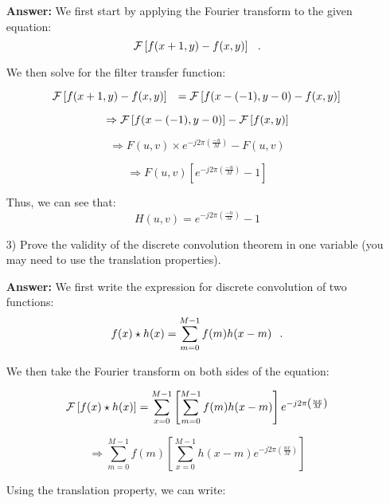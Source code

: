 \documentclass{article}
\begin{document}
\begin{enumerate}
\textbf{Answer:} We first start by applying the Fourier transform to the given equation:
$${\cal F} \left[ f(x + 1,y) - f(x,y) \right] \hspace{0.1in} .$$

We then solve for the filter transfer function:

\begin{equation}
{\cal F} \left[ f(x + 1,y) - f(x,y) \right] \hspace{0.1in} = {\cal F} \left[ f(x-(-1),y-0) - f(x,y) \right]
\end{equation}

\begin{equation}
\Rightarrow {\cal F}\left[ f(x - (-1), y - 0) \right] - {\cal F}\left[ f(x,y) \right]
\end{equation}

\begin{equation}
\Rightarrow F(u,v) \times e^{-j2\pi \left( \frac{-u}{M} \right)} - F(u,v)
\end{equation}

\begin{equation}
\Rightarrow F(u,v) \left[ e^{-j2\pi \left( \frac{-u}{M} \right)} - 1\right]
\end{equation}

Thus, we can see that:
$$H(u,v) = e^{-j2\pi \left( \frac{-u}{M} \right)} - 1$$

\item[3)] Prove the validity of the discrete convolution theorem in one variable (you may need to use the translation properties). 

\textbf{Answer: }We first write the expression for discrete convolution of two functions:
$$f(x) \star h(x)= \sum_{m = 0}^{M-1} f(m)h(x-m) \hspace{0.1in} .$$ 

We then take the Fourier transform on both sides of the equation:

\begin{equation}
{\cal F} \left[ f(x) \star h(x) \right] = \sum_{x=0}^{M-1} \left[ \sum_{m=0}^{M-1} f(m)h(x-m) \right] e^{-j2\pi \left( \frac{ux}{M}\right)}
\end{equation}

\begin{equation}
\Rightarrow \sum_{m=0}^{M-1} f(m) \left[ \sum_{x=0}^{M-1} h(x-m) e^{-j2\pi \left( \frac{ux}{M}\right)} \right]
\end{equation}

Using the translation property, we can write:


\end{enumerate}
\end{document}
